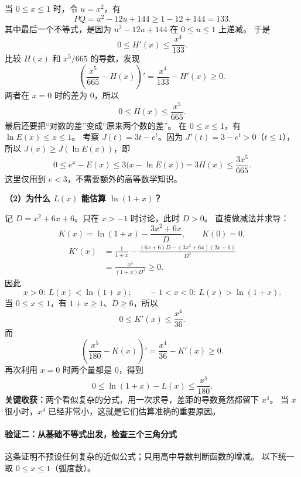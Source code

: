 \begin{proofbox}
当 $0\le x\le1$ 时，令 $u=x^2$，有
\[
PQ=u^2-12u+144\ge1-12+144=133.
\]
其中最后一个不等式，是因为 $u^2-12u+144$ 在 $0\le u\le1$ 上递减。
于是
\[
0\le H'(x)\le\frac{x^4}{133}.
\]
比较 $H(x)$ 和 $x^5/665$ 的导数，发现
\[
\left(\frac{x^5}{665}-H(x)\right)'
=\frac{x^4}{133}-H'(x)\ge0.
\]
两者在 $x=0$ 时的差为 $0$，所以
\[
0\le H(x)\le\frac{x^5}{665}.
\]
最后还要把“对数的差”变成“原来两个数的差”。
在 $0\le x\le1$，有 $\ln E(x)\le x\le1$。
考察 $J(t)=3t-e^t$。因为 $J'(t)=3-e^t>0$（$t\le1$），
所以 $J(x)\ge J(\ln E(x))$，即
\[
0\le e^x-E(x)\le3\bigl(x-\ln E(x)\bigr)
=3H(x)\le\boxed{\frac{3x^5}{665}}.
\]
这里仅用到 $e<3$，不需要额外的高等数学知识。

\medskip
\textbf{（2）为什么 $L(x)$ 能估算 $\ln(1+x)$？}
\begin{center}\end{center}

记 $D=x^2+6x+6$。只在 $x>-1$ 时讨论，此时 $D>0$。
直接做减法并求导：
\[
K(x)=\ln(1+x)-\frac{3x^2+6x}{D},\qquad K(0)=0,
\]
\[
\begin{aligned}
K'(x)&=\frac1{1+x}
-\frac{(6x+6)D-(3x^2+6x)(2x+6)}{D^2}\\
&=\boxed{\frac{x^4}{(1+x)D^2}}\ge0.
\end{aligned}
\]
因此
\[
\boxed{x>0:\ L(x)<\ln(1+x);\qquad -1<x<0:\ L(x)>\ln(1+x).}
\]
当 $0\le x\le1$，有 $1+x\ge1$、$D\ge6$，所以
\[
0\le K'(x)\le\frac{x^4}{36}.
\]
而
\[
\left(\frac{x^5}{180}-K(x)\right)'=
\frac{x^4}{36}-K'(x)\ge0.
\]
再次利用 $x=0$ 时两个量都是 $0$，得到
\[
0\le\ln(1+x)-L(x)\le\boxed{\frac{x^5}{180}}.
\]
\textbf{关键收获：}两个看似复杂的分式，用一次求导，差距的导数竟然都留下 $x^4$。
当 $x$ 很小时，$x^4$ 已经非常小，这就是它们估算准确的重要原因。

\newpage
\paragraph{验证二：从基础不等式出发，检查三个三角分式}
\begin{center}\end{center}

这条证明不预设任何复杂的近似公式；只用高中导数判断函数的增减。
以下统一取 $0\le x\le1$（弧度数）。


\end{proofbox}
